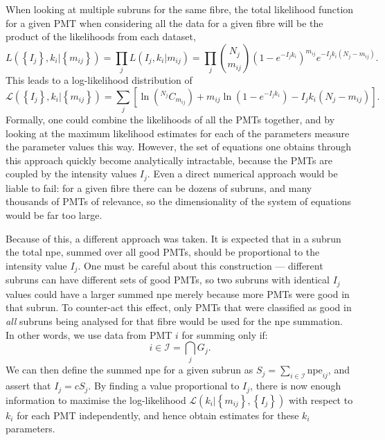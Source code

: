 When looking at multiple subruns for the same fibre, the total likelihood function for a given PMT when considering all the data for a given fibre will be the product of the likelihoods from each dataset,
\begin{equation}
    L\left(\left\{I_{j}\right\}, k_{i} | \left\{m_{ij}\right\}\right) = \prod_{j} L(I_{j}, k_{i} | m_{ij}) = \prod_{j}\binom{N_{j}}{m_{ij}}\left(1-e^{-I_{j}k_{i}}\right)^{m_{ij}}e^{-I_{j}k_{i}(N_{j}-m_{ij})}.
\end{equation}
This leads to a log-likelihood distribution of
\begin{equation}
    \mathcal{L}\left(\left\{I_{j}\right\}, k_{i} | \left\{m_{ij}\right\}\right) = \sum_{j}\left[\ln\left(^{N_{j}}C_{m_{ij}}\right) + m_{ij}\ln\left(1 - e^{-I_{j}k_{i}}\right) - I_{j}k_{i}\left(N_{j} - m_{ij}\right)\right].
\end{equation}
Formally, one could combine the likelihoods of all the PMTs together, and by looking at the maximum likelihood estimates for each of the parameters measure the parameter values this way. However, the set of equations one obtains through this approach quickly become analytically intractable, because the PMTs are coupled by the intensity values $I_{j}$. Even a direct numerical approach would be liable to fail: for a given fibre there can be dozens of subruns, and many thousands of PMTs of relevance, so the dimensionality of the system of equations would be far too large.

Because of this, a different approach was taken. It is expected that in a subrun the total npe, summed over all good PMTs, should be proportional to the intensity value $I_{j}$. One must be careful about this construction --- different subruns can have different sets of good PMTs, so two subruns with identical $I_{j}$ values could have a larger summed npe merely because more PMTs were good in that subrun. To counter-act this effect, only PMTs that were classified as good in \textit{all} subruns being analysed for that fibre would be used for the npe summation. In other words, we use data from PMT $i$ for summing only if:
\begin{equation}
    i \in \mathcal{I} = \bigcap_{j}G_{j}.
\end{equation}
We can then define the summed npe for a given subrun as $S_{j} = \sum_{i\in\mathcal{I}}\text{npe}_{ij}$, and assert that $I_{j} = cS_{j}$. By finding a value proportional to $I_{j}$, there is now enough information to maximise the log-likelihood $\mathcal{L}\left(k_{i} | \left\{m_{ij}\right\}, \left\{I_{j}\right\}\right)$ with respect to $k_{i}$ for each PMT independently, and hence obtain estimates for these $k_{i}$ parameters.

